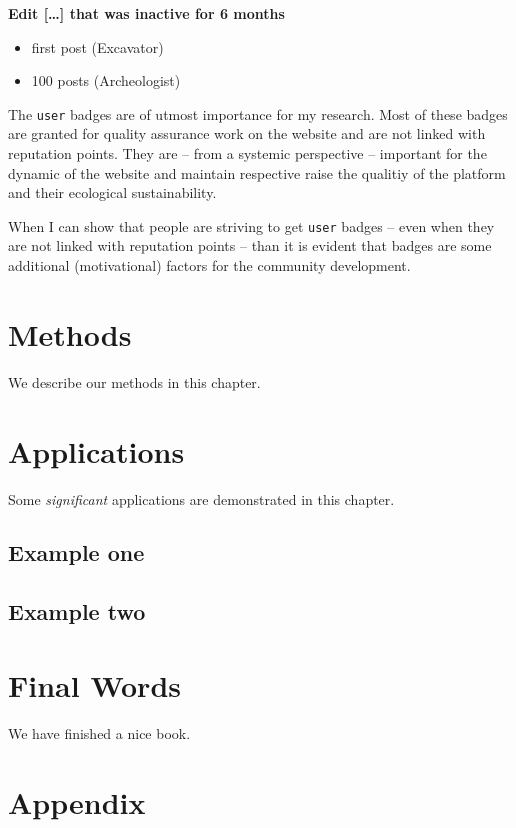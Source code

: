 \documentclass[]{book}
\providecommand{\tightlist}{%
  \setlength{\itemsep}{0pt}\setlength{\parskip}{0pt}}
\theoremstyle{definition}
\theoremstyle{definition}
\theoremstyle{definition}
\theoremstyle{remark}
\begin{document}
\textbf{Edit {[}\ldots{}{]} that was inactive for 6 months}

\begin{itemize}
\tightlist
\item
  first post (Excavator)
\item
  100 posts (Archeologist)
\end{itemize}

The \texttt{user} badges are of utmost importance for my research. Most
of these badges are granted for quality assurance work on the website
and are not linked with reputation points. They are -- from a systemic
perspective -- important for the dynamic of the website and maintain
respective raise the qualitiy of the platform and their ecological
sustainability.

When I can show that people are striving to get \texttt{user} badges --
even when they are not linked with reputation points -- than it is
evident that badges are some additional (motivational) factors for the
community development.

\chapter{Methods}\label{methods}

We describe our methods in this chapter.

\chapter{Applications}\label{applications}

Some \emph{significant} applications are demonstrated in this chapter.

\section{Example one}\label{example-one}

\section{Example two}\label{example-two}

\chapter{Final Words}\label{final-words}

We have finished a nice book.

\chapter{Appendix}\label{appendix}
\end{document}
